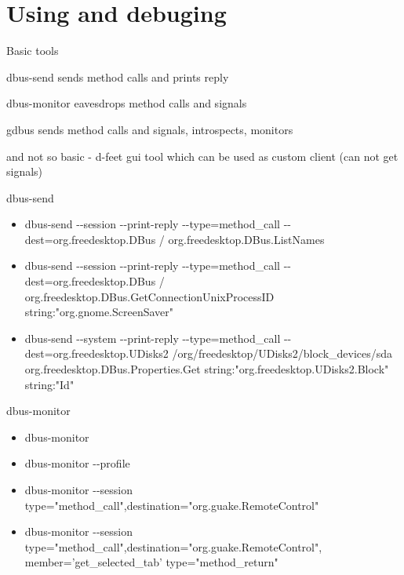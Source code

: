 \documentclass{beamer}
\begin{document}
\section{Using and debuging}

\begin{frame}{Basic tools}
  \begin{block}{dbus-send}
    sends method calls and prints reply
  \end{block}
  \begin{block}{dbus-monitor}
    eavesdrops method calls and signals
  \end{block}
  \begin{block}{gdbus}
    sends method calls and signals, introspects, monitors
  \end{block}
  \begin{block}{and not so basic - d-feet}
    gui tool which can be used as custom client (can not get signals)
  \end{block}
\end{frame}

\begin{frame}{dbus-send}
  \begin{itemize}
    \item dbus-send -{}-session -{}-print-reply -{}-type=method\_call -{}-dest=org.freedesktop.DBus / org.freedesktop.DBus.ListNames
    \item dbus-send -{}-session -{}-print-reply -{}-type=method\_call -{}-dest=org.freedesktop.DBus / org.freedesktop.DBus.GetConnectionUnixProcessID string:"org.gnome.ScreenSaver"
    \item dbus-send -{}-system -{}-print-reply -{}-type=method\_call -{}-dest=org.freedesktop.UDisks2 /org/freedesktop/UDisks2/block\_devices/sda org.freedesktop.DBus.Properties.Get string:"org.freedesktop.UDisks2.Block" string:"Id"
  \end{itemize}
\end{frame}

\begin{frame}{dbus-monitor}
  \begin{itemize}
    \item dbus-monitor
    \item dbus-monitor -{}-profile
    \item dbus-monitor -{}-session type="method\_call",destination="org.guake.RemoteControl"
    \item dbus-monitor -{}-session type="method\_call",destination="org.guake.RemoteControl",\\member='get\_selected\_tab' type="method\_return"
  \end{itemize}
\end{frame}
\end{document}
